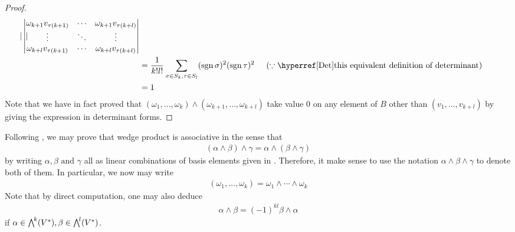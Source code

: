 \documentclass{report}
\begin{document}
\begin{proof}
\begin{align*}
\begin{vmatrix}
  \end{vmatrix} \begin{vmatrix}
      \omega_{k+1} v_{\tau (k+1)} &\cdots & \omega_{k+1} v_{\tau (k+l)} \\
      \vdots & \ddots & \vdots \\
      \omega_{k+l} v_{\tau (k+1)} & \cdots & \omega_{k+l}v_{\tau (k+l)}
  \end{vmatrix} \\
  &= \frac{1}{k!l!} \sum_{\sigma \in S_k ,\tau \in S_l} (\operatorname{sgn}\sigma)^2 (\operatorname{sgn}\tau)^2 \hspace{0.5cm}(\because \text{\customref{Det}{this equivalent definition of determinant}}) \\
  &=1
\end{align*}
Note that we have in fact proved that $(\omega_1,\dots ,\omega_k)\wedge  (\omega_{k+1},\dots ,\omega_{k+l})$ take value $0$ on any element of  $B$ other than  $(v_1,\dots ,v_{k+l})$ by giving the expression in determinant forms. 
\end{proof}
\begin{mdframed}
Following , we may prove that wedge product is associative in the sense that 
\begin{align*}
  (\alpha \wedge  \beta )\wedge  \gamma =\alpha  \wedge  (\beta  \wedge  \gamma  )   
\end{align*}
by writing $\alpha ,\beta \text{ and }\gamma $ all as linear combinations of basis elements given in .  Therefore, it make sense to use the notation $\alpha \wedge  \beta  \wedge \gamma $ to denote both of them. In particular, we now may write 
\begin{align*}
  (\omega_1,\dots ,\omega_k)=\omega_1 \wedge  \cdots \wedge  \omega_k  
\end{align*}
Note that by direct computation, one may also deduce 
\begin{align*}
\alpha \wedge  \beta = (-1)^{kl}\beta  \wedge  \alpha 
\end{align*}
if $\alpha \in \extp^k(V^*),\beta \in \extp^l(V^*)$. 
\end{mdframed}
\end{document}
